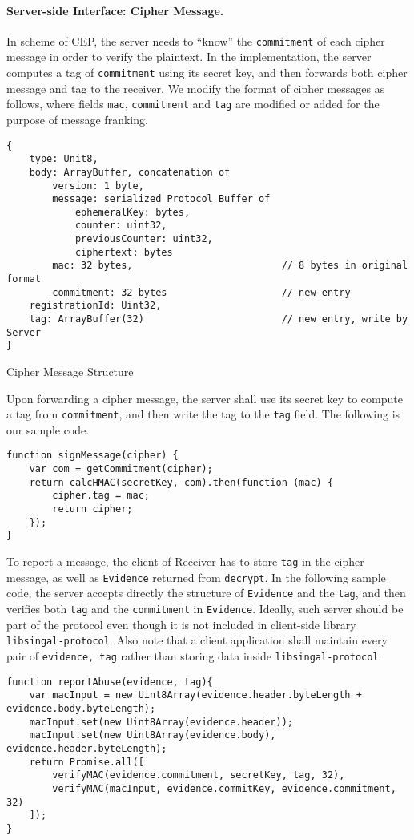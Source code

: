 \documentclass{article}
\begin{document}
\paragraph{Server-side Interface: Cipher Message.}
In scheme of CEP, the server needs to ``know'' 
the {\tt commitment} of each cipher message
in order to verify the plaintext.
In the implementation, 
the server computes a tag of {\tt commitment} using its secret key,
and then forwards both cipher message and tag to the receiver.
We modify the format of cipher messages as follows,
where fields {\tt mac}, {\tt commitment} and {\tt tag}
are modified or added for the purpose of message franking.
\begin{table}[h]
{\small
\begin{verbatim}
{
    type: Unit8, 
    body: ArrayBuffer, concatenation of
        version: 1 byte,
        message: serialized Protocol Buffer of
            ephemeralKey: bytes,
            counter: uint32, 
            previousCounter: uint32, 
            ciphertext: bytes
        mac: 32 bytes,                          // 8 bytes in original format
        commitment: 32 bytes                    // new entry
    registrationId: Uint32, 
    tag: ArrayBuffer(32)                        // new entry, write by Server
}
\end{verbatim}
}
\caption{Cipher Message Structure}
\label{tbl:cipher-message}
\end{table}
Upon forwarding a cipher message,
the server shall use its secret key to compute a tag from {\tt commitment},
and then write the tag to the {\tt tag} field.
The following is our sample code.
{\small
\begin{verbatim}
function signMessage(cipher) {
    var com = getCommitment(cipher);
    return calcHMAC(secretKey, com).then(function (mac) {
        cipher.tag = mac;
        return cipher;
    });
}
\end{verbatim}
}
To report a message,
the client of Receiver has to store {\tt tag} in the cipher message,
as well as {\tt Evidence} returned from {\tt decrypt}.
In the following sample code, 
the server accepts directly the structure of {\tt Evidence} and the {\tt tag},
and then verifies both {\tt tag} and the {\tt commitment} in {\tt Evidence}.
Ideally, such server should be part of the protocol
even though it is not included in client-side library {\tt libsingal-protocol}.
Also note that a client application shall maintain every pair of 
{\tt evidence, tag} rather than storing data inside {\tt libsingal-protocol}. 
{\small
\begin{verbatim}
function reportAbuse(evidence, tag){
    var macInput = new Uint8Array(evidence.header.byteLength + evidence.body.byteLength);
    macInput.set(new Uint8Array(evidence.header));
    macInput.set(new Uint8Array(evidence.body), evidence.header.byteLength);
    return Promise.all([
        verifyMAC(evidence.commitment, secretKey, tag, 32),
        verifyMAC(macInput, evidence.commitKey, evidence.commitment, 32)
    ]);
}
\end{verbatim}
}
\end{document}
